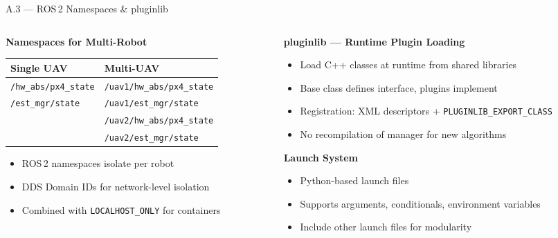 \documentclass[aspectratio=169, 10pt]{beamer}
\begin{document}
\begin{frame}{A.3 --- ROS\,2 Namespaces \& pluginlib}
\begin{columns}[T]
\begin{column}{0.48\textwidth}
\textbf{Namespaces for Multi-Robot}

\vspace{0.3em}
\scriptsize
\begin{tabular}{@{}ll@{}}
\toprule
\textbf{Single UAV} & \textbf{Multi-UAV} \\
\midrule
\texttt{/hw\_abs/px4\_state} & \texttt{/uav1/hw\_abs/px4\_state} \\
\texttt{/est\_mgr/state} & \texttt{/uav1/est\_mgr/state} \\
& \texttt{/uav2/hw\_abs/px4\_state} \\
& \texttt{/uav2/est\_mgr/state} \\
\bottomrule
\end{tabular}

\vspace{0.3em}
\normalsize
\begin{itemize}\small
  \item ROS\,2 namespaces isolate per robot
  \item DDS Domain IDs for network-level isolation
  \item Combined with \texttt{LOCALHOST\_ONLY} for containers
\end{itemize}
\end{column}

\begin{column}{0.48\textwidth}
\textbf{pluginlib --- Runtime Plugin Loading}

\vspace{0.3em}
\begin{itemize}\small
  \item Load C++ classes at runtime from shared libraries
  \item Base class defines interface, plugins implement
  \item Registration: XML descriptors + \texttt{PLUGINLIB\_EXPORT\_CLASS}
  \item No recompilation of manager for new algorithms
\end{itemize}

\vspace{0.3em}
\textbf{Launch System}
\begin{itemize}\small
  \item Python-based launch files
  \item Supports arguments, conditionals, environment variables
  \item Include other launch files for modularity
\end{itemize}
\end{column}
\end{columns}
\end{frame}
\end{document}
